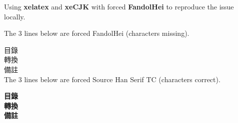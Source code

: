 \documentclass[a4, 10pt]{article}
\begin{document}
Using \textbf{xelatex} and \textbf{xeCJK} with forced \textbf{FandolHei} to reproduce the issue locally.\newline

The 3 lines below are forced FandolHei (characters missing).\newline

目錄\\ 

轉換\\ 

備註\\  

The 3 lines below are forced Source Han Serif TC (characters correct).\newline

\textbf{目錄}\\ 

\textbf{轉換}\\ 

\textbf{備註}\\
\end{document}
